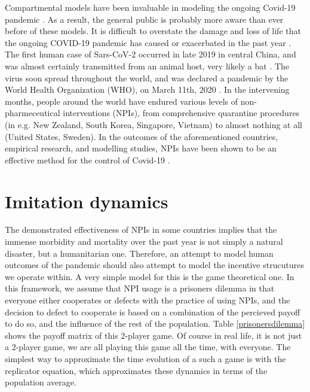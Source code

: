 Compartmental models have been invaluable in modeling the ongoing Covid-19 pandemic \cite{thompson2020epidemiological}. As a result, the general public is probably more aware than ever before of these models. It is difficult to overstate the damage and loss of life that the ongoing COVID-19 pandemic has caused or exacerbated in the past year \cite{miller2020disease,who2021impact}. The first human case of Sars-CoV-2 occurred in late 2019 in central China, and was almost certainly transmitted from an animal host, very likely a bat \cite{andersen2020proximal,rasmussen2021origins,zhu2020novel}. The virus soon spread throughout the world, and was declared a pandemic by the World Health Organization (WHO), on March 11th, 2020 \cite{who2020announces}. In the intervening months, people around the world have endured various levels of non-pharmeceutical interventions (NPIs), from comprehensive quarantine procedures (in e.g. New Zealand, South Korea, Singapore, Vietnam) to almost nothing at all (United States, Sweden). In the outcomes of the aforementioned countries, empirical research, and modelling studies, NPIs have been shown to be an effective method for the control of Covid-19 \cite{anderson2020estimating,flaxman2020estimating,ferguson2020report,demirguc2020sooner}. 



\section{Imitation dynamics}


The demonstrated effectiveness of NPIs in some countries implies that the immense morbidity and mortality over the past year is not simply a natural disaster, but a humanitarian one. Therefore, an attempt to model human outcomes of the pandemic should also attempt to model the incentive strucutures we operate within. A very simple model for this is the game theoretical one. In this framework, we assume that NPI usage is a prisoners dilemma in that everyone either cooperates or defects with the practice of using NPIs, and the decision to defect to cooperate is based on a combination of the percieved payoff to do so, and the influence of the rest of the population. Table \ref{prisonersdilemma} shows the payoff matrix of this 2-player game. Of course in real life, it is not just a 2-player game, we are all playing this game all the time, with everyone. The simplest way to approximate the time evolution of a such a game is with the replicator equation, which approximates these dynamics in terms of the population average.

